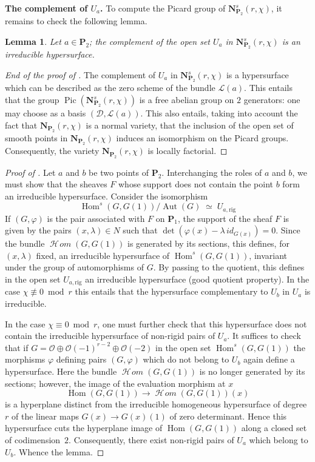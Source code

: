 \documentclass[12pt,english]{smfart}%
\theoremstyle{plain}
\newtheorem{lemma}[theorem]{Lemma}
\theoremstyle{definition}
\theoremstyle{remark}
\newcommand{\PP}{\mathbf{P}}
\newcommand{\Oh}{\mathcal{O}}
\DeclareMathOperator{\Hom}{Hom}
\DeclareMathOperator{\Aut}{Aut}
\DeclareMathOperator{\Pic}{Pic}
\newcommand{\Homsh}{\mathop{\mathcal{H}\!\mathit{om}}\nolimits}
\newcommand{\origpage}[1]{\marginnote{\scriptsize\itshape p.~#1}}
\begin{document}
\medskip
\noindent\textbf{The complement of $U_{a}$.} To compute the Picard group of $\mathbf{N}^{s}_{\PP_{2}}(r,\chi)$, it remains to check the following lemma.

\begin{lemma}\label{lem:complement-Ua}
Let $a\in\PP_{2}$; the complement of the open set $U_{a}$ in $\mathbf{N}^{s}_{\PP_{2}}(r,\chi)$ is an irreducible hypersurface.
\end{lemma}

\begin{proof}[End of the proof of ]
The complement of $U_{a}$ in $\mathbf{N}^{s}_{\PP_{2}}(r,\chi)$ is a hypersurface which can be described as the zero scheme of the bundle $\mathscr{L}(a)$. This entails that the group $\Pic(\mathbf{N}^{s}_{\PP_{2}}(r,\chi))$ is a free abelian group on $2$ generators: one may choose as a basis $(\mathscr{D},\mathscr{L}(a))$. This also entails, taking into account the fact that $\mathbf{N}_{\PP_{2}}(r,\chi)$ is a normal variety, that the inclusion of the open set of smooth points in $\mathbf{N}_{\PP_{2}}(r,\chi)$ induces an isomorphism on the Picard groups. Consequently, the variety $\mathbf{N}_{\PP_{2}}(r,\chi)$ is locally factorial.
\end{proof}

\begin{proof}[Proof of ]
Let $a$ and $b$ be two points of $\PP_{2}$. Interchanging the roles of $a$ and $b$, we must show that the sheaves $F$ whose support does not contain the point $b$ form an irreducible hypersurface. Consider the isomorphism
\[
\Hom^{s}(G,G(1))/\Aut(G) \;\simeq\; U_{a,\mathrm{rig}}
\]
If $(G,\varphi)$ is the pair associated with $F$ on $\PP_{1}$, the support of the sheaf $F$ is given by the pairs $(x,\lambda)\in N$ such that $\det(\varphi(x)-\lambda\, id_{G(x)})=0$. Since the bundle $\Homsh(G,G(1))$ is generated by its sections, this defines, for $(x,\lambda)$ fixed, an irreducible hypersurface of $\Hom^{s}(G,G(1))$, invariant under the group of automorphisms of $G$. By passing to the quotient, this defines in the open set $U_{a,\mathrm{rig}}$ an irreducible hypersurface (good quotient property). In the case $\chi\not\equiv 0\bmod r$ this entails that the hypersurface complementary to $U_{b}$ in $U_{a}$ is irreducible.

\origpage{654}
In the case $\chi\equiv 0\bmod r$, one must further check that this hypersurface does not contain the irreducible hypersurface of non-rigid pairs of $U_{a}$. It suffices to check that if $G=\Oh\oplus\Oh(-1)^{r-2}\oplus\Oh(-2)$ in the open set $\Hom^{s}(G,G(1))$ the morphisms $\varphi$ defining pairs $(G,\varphi)$ which do not belong to $U_{b}$ again define a hypersurface. Here the bundle $\Homsh(G,G(1))$ is no longer generated by its sections; however, the image of the evaluation morphism at $x$
\[
\Hom(G,G(1)) \longrightarrow \Homsh(G,G(1))(x)
\]
is a hyperplane distinct from the irreducible homogeneous hypersurface of degree $r$ of the linear maps $G(x)\to G(x)(1)$ of zero determinant. Hence this hypersurface cuts the hyperplane image of $\Hom(G,G(1))$ along a closed set of codimension~$2$. Consequently, there exist non-rigid pairs of $U_{a}$ which belong to $U_{b}$. Whence the lemma.
\end{proof}
\end{document}
